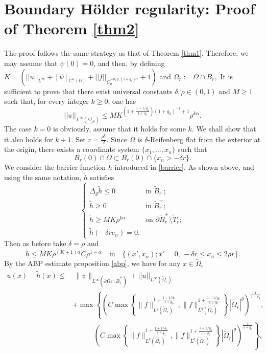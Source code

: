 \documentclass[11pt, leqno]{article}
\theoremstyle{definition}
\theoremstyle{remark}
\numberwithin{equation}{section}
\begin{document}
\section{Boundary Hölder regularity: Proof of Theorem \ref{thm2}}\label{Sec5}

The proof follows the same strategy as that of Theorem \ref{thm1}. Therefore, we may assume that \(\psi(0)=0\), and then, by defining $K= \left(||u||_{L^{\infty}} + [\psi]_{C^\alpha(0)}+ ||f||_{C_q^{-n/q,(1+g_0)\alpha}}+ 1\right)$ and $\Omega_r:=\Omega\cap B_r,$ It is sufficient to prove that there exist universal constants \(\delta, \rho \in (0,1)\) and \(M \geq 1\) such that, for every integer \(k \geq 0\), one has
$$||u||_{L^\infty(\Omega_{\rho^k})}\leq MK^{\left(1+\frac{1+1/g_0}{1+\delta_0}\right)(1+g_0)^{-1}+1}\rho^{k\alpha}.$$
The case $k=0$ is obviously, assume that it holds for some \(k\). We shall show that it also holds for \(k+1\).
 Set $r=\frac{\rho^k}{2}.$ Since \(\Omega\) is \(\delta\)-Reifenberg flat from the exterior at the origin, there exists a coordinate system \(\{x_1,\ldots,x_n\}\) such that
 $$B_r(0)\cap\Omega\subset B_r(0)\cap\{x_n>-\delta r\}.  $$
We consider the barrier function \(\widetilde{h}\) introduced in \eqref{barrier}. As shown above, and using the same notation, \(\widetilde{h}\) satisfies
\[
\begin{cases}
    \Delta_g\tilde{h}\leq 0 & \text{in } \tilde{B}_r^+; \\
    \tilde{h}\geq 0 & \text{in } \tilde{B}_r^+; \\
    \tilde{h}\geq MK\rho^{k\alpha} & \text{on } \partial\tilde{B}_r^+ \setminus \tilde{T}_r; \\
    \tilde{h}(-\delta r e_n) = 0.
\end{cases}
\]
Then as before take $\delta=\rho$ and
\begin{equation}\label{equ8}
    \tilde{h}\leq MK\rho^{(K+1)\alpha}\tilde{C}\rho^{1-\alpha} \quad\text{in}\quad \{(x',x_n); x'=0,\,-\delta r\leq x_n\leq 2\rho r\}.
\end{equation}
By the ABP estimate proposition \ref{abp}, we have for any $x\in \tilde{\Omega}_r$
\begin{align*}
u(x)-\tilde{h}(x) \leq &\; \|\psi\|_{L^\infty(\partial\Omega\cap \tilde{B}_r^+)}+ ||u||_{L^\infty(\tilde{\Omega}_{r})}\\
&+ \max \left\{ 
\left( C \max\left\{ 
\|f\|_{L^q(\tilde{\Omega}_r)}^{1+ \frac{1+1/\delta_0}{1+g_0}}, 
\|f\|_{L^q(\tilde{\Omega}_r)}^{1+ \frac{1+1/g_0}{1+\delta_0}}
\right\} |\tilde{\Omega}_r|^\theta \right)^{\frac{1}{1+\delta_0}}, \right. \\
&\qquad\quad \left.
\left( C \max\left\{ 
\|f\|_{L^q(\tilde{\Omega}_r)}^{1+ \frac{1+1/\delta_0}{1+g_0}}, 
\|f\|_{L^q(\tilde{\Omega}_r)}^{1+ \frac{1+1/g_0}{1+\delta_0}}
\right\} |\tilde{\Omega}_r|^\theta \right)^{\frac{1}{1+g_0}} 
\right\},
\end{align*}
\end{document}
